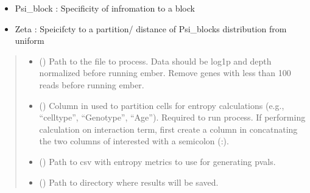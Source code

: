 \documentclass[letterpaper,10pt,english]{sphinxmanual}
\begin{document}
\begin{fulllineitems}
\begin{description}
\begin{itemize}
\item {} 
\sphinxAtStartPar
Psi\_block : Specificity of infromation to a block

\item {} 
\sphinxAtStartPar
Zeta : Speicifcty to a partition/ distance of Psi\_blocks distribution from uniform

\end{itemize}

\end{description}
\begin{quote}\begin{description}
\begin{itemize}
\item {} 
\sphinxAtStartPar
{} (\sphinxstyleliteralemphasis{\sphinxupquote{, }}) \textendash{} Path to the  file to process.
Data should be log1p and depth normalized before running ember.
Remove genes with less than 100 reads before running ember.

\item {} 
\sphinxAtStartPar
{} (\sphinxstyleliteralemphasis{\sphinxupquote{, }}) \textendash{} Column in  used to partition cells for entropy calculations
(e.g., “celltype”, “Genotype”, “Age”). Required to run process.
If performing calculation on interaction term, first create a column
in  concatnating the two columns of interested with a semicolon (:).

\item {} 
\sphinxAtStartPar
{} (\sphinxstyleliteralemphasis{\sphinxupquote{, }}) \textendash{} Path to csv with entropy metrics to use for generating pvals.

\item {} 
\sphinxAtStartPar
{} (\sphinxstyleliteralemphasis{\sphinxupquote{, }}) \textendash{} Path to directory where results will be saved.


\end{itemize}
\end{description}
\end{quote}
\end{fulllineitems}
\end{document}
